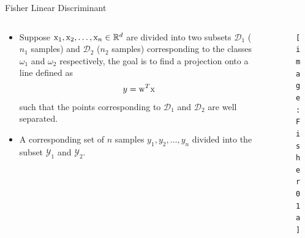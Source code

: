 
\begin{frame}{Fisher Linear Discriminant}
\begin{columns}
\begin{column}{7cm}
\begin{itemize}
\item Suppose ${\rm x}_1,{\rm x}_2,\ldots,{\rm x}_n\in \mathbb{R}^d$ are divided into two subsets $\mathcal{D}_1$ ($n_1$  samples) and $\mathcal{D}_2$ ($n_2$  samples)
corresponding to the classes $\omega_1$ and $\omega_2$ respectively, the
goal is to find a projection onto a line defined as
\begin{equation}
{y}={\rm w}^T{\rm x} \nonumber
\end{equation}
such that the points corresponding to $\mathcal{D}_1$ and $\mathcal{D}_2$ are well separated.
\item A corresponding set of $n$ samples ${y}_1,{y}_2,\ldots,{y}_n$ divided into the subset $\mathcal{Y}_1$ and $\mathcal{Y}_2$.\nocite{duda2012pattern}
\end{itemize}
\end{column}
\begin{column}{6cm}
\begin{figure}
\texttt{[image: Fisher01a]}
\end{figure}
\end{column}
\end{columns}
\end{frame}

